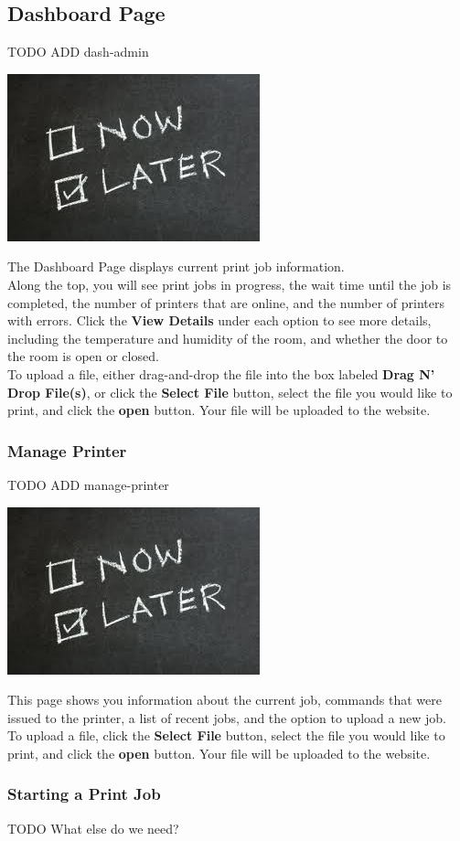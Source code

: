 \newpage
  \subsection{Dashboard Page}
TODO ADD dash-admin
      \begin{center}
      \includegraphics[scale=1]{images/Now-Later.png}
    \end{center} 
      The Dashboard Page displays current print job information.\\
      Along the top, you will see print jobs in progress, the wait time until the job is completed, the number
      of printers that are online, and the number of printers with errors.  Click the \textbf{View Details} under
      each option to see more details, including the temperature and humidity of the room, and whether the door
      to the room is open or closed.\\
      To upload a file, either drag-and-drop the file into the box labeled \textbf{Drag N' Drop File(s)}, or 
      click the \textbf{Select File} button, select the file you would like
      to print, and click the \textbf{open} button.  Your file will be uploaded to the website.
      

  \subsubsection{Manage Printer}
TODO ADD manage-printer
      \begin{center}
      \includegraphics[scale=1]{images/Now-Later.png}
    \end{center} 
      This page shows you information about the current job, commands that were issued to the printer, a list of recent
      jobs, and the option to upload a new job.\\
      To upload a file, click the \textbf{Select File} button, select the file you would like
      to print, and click the \textbf{open} button.  Your file will be uploaded to the website.\\


  \subsubsection{Starting a Print Job}

TODO What else do we need?


